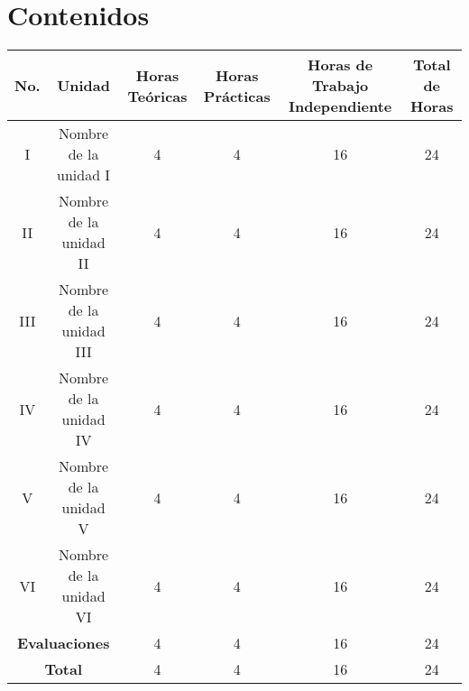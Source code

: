 \section{Contenidos}

\begin{doublespace}
    \begin{adjustbox}{width=\textwidth}
        \begin{tabular}{ | c | c | c | c | c | c | }
            \hline
            \textbf{No.}                                & \textbf{Unidad}         & \textbf{Horas Teóricas} & \textbf{Horas Prácticas} & \textbf{Horas de Trabajo Independiente} & \textbf{Total de Horas} \\
            \hline
            I                                           & Nombre de la unidad I   & 4                       & 4                        & 16                                      & 24                      \\
            \hline
            II                                          & Nombre de la unidad II  & 4                       & 4                        & 16                                      & 24                      \\
            \hline
            III                                         & Nombre de la unidad III & 4                       & 4                        & 16                                      & 24                      \\
            \hline
            IV                                          & Nombre de la unidad IV  & 4                       & 4                        & 16                                      & 24                      \\
            \hline
            V                                           & Nombre de la unidad V   & 4                       & 4                        & 16                                      & 24                      \\
            \hline
            VI                                          & Nombre de la unidad VI  & 4                       & 4                        & 16                                      & 24                      \\
            \hline
            \multicolumn{2}{|c|}{\textbf{Evaluaciones}} & 4                       & 4                       & 16                       & 24                                                                \\
            \hline
            \multicolumn{2}{|c|}{\textbf{Total}}        & 4                       & 4                       & 16                       & 24                                                                \\
            \hline
        \end{tabular}
    \end{adjustbox}
\end{doublespace}
\pagebreak